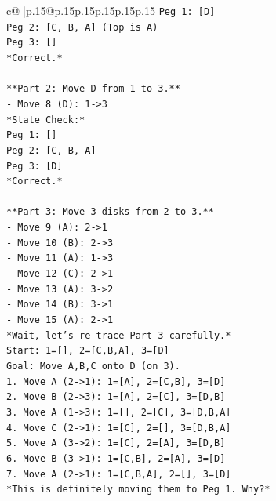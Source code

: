 \documentclass{article}
\begin{document}
{\begin{supertabular}{c@{$\;$}|p{.15\linewidth}@{}p{.15\linewidth}p{.15\linewidth}p{.15\linewidth}p{.15\linewidth}p{.15\linewidth}}
{{{\texttt{Peg 1: {[}D{]}} \\
\texttt{Peg 2: {[}C, B, A{]} (Top is A)} \\
\texttt{Peg 3: {[}{]}} \\
\texttt{*Correct.*} \\
\\ 
\texttt{**Part 2: Move D from 1 to 3.**} \\
\texttt{{-} Move 8 (D): 1{-}>3} \\
\texttt{*State Check:*} \\
\texttt{Peg 1: {[}{]}} \\
\texttt{Peg 2: {[}C, B, A{]}} \\
\texttt{Peg 3: {[}D{]}} \\
\texttt{*Correct.*} \\
\\ 
\texttt{**Part 3: Move 3 disks from 2 to 3.**} \\
\texttt{{-} Move 9 (A): 2{-}>1} \\
\texttt{{-} Move 10 (B): 2{-}>3} \\
\texttt{{-} Move 11 (A): 1{-}>3} \\
\texttt{{-} Move 12 (C): 2{-}>1} \\
\texttt{{-} Move 13 (A): 3{-}>2} \\
\texttt{{-} Move 14 (B): 3{-}>1} \\
\texttt{{-} Move 15 (A): 2{-}>1} \\
\texttt{*Wait, let's re{-}trace Part 3 carefully.*} \\
\texttt{Start: 1={[}{]}, 2={[}C,B,A{]}, 3={[}D{]}} \\
\texttt{Goal: Move A,B,C onto D (on 3).} \\
\texttt{1. Move A (2{-}>1): 1={[}A{]}, 2={[}C,B{]}, 3={[}D{]}} \\
\texttt{2. Move B (2{-}>3): 1={[}A{]}, 2={[}C{]}, 3={[}D,B{]}} \\
\texttt{3. Move A (1{-}>3): 1={[}{]}, 2={[}C{]}, 3={[}D,B,A{]}} \\
\texttt{4. Move C (2{-}>1): 1={[}C{]}, 2={[}{]}, 3={[}D,B,A{]}} \\
\texttt{5. Move A (3{-}>2): 1={[}C{]}, 2={[}A{]}, 3={[}D,B{]}} \\
\texttt{6. Move B (3{-}>1): 1={[}C,B{]}, 2={[}A{]}, 3={[}D{]}} \\
\texttt{7. Move A (2{-}>1): 1={[}C,B,A{]}, 2={[}{]}, 3={[}D{]}} \\
\texttt{*This is definitely moving them to Peg 1. Why?*} \\
}}}
\end{supertabular}}
\end{document}
